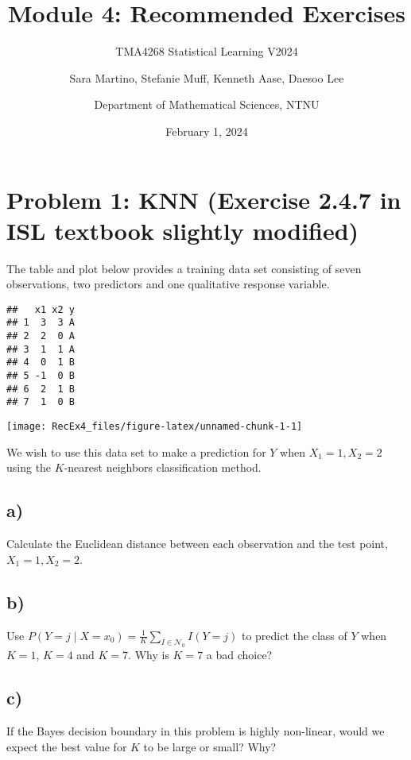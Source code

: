 \documentclass[
]{article}
\title{Module 4: Recommended Exercises}
\subtitle{TMA4268 Statistical Learning V2024}
\author{Sara Martino, Stefanie Muff, Kenneth Aase, Daesoo
Lee \and Department of Mathematical Sciences, NTNU}
\date{February 1, 2024}
\begin{document}
\maketitle

\hypertarget{problem-1-knn-exercise-2.4.7-in-isl-textbook-slightly-modified}{%
\section{Problem 1: KNN (Exercise 2.4.7 in ISL textbook slightly
modified)}\label{problem-1-knn-exercise-2.4.7-in-isl-textbook-slightly-modified}}

The table and plot below provides a training data set consisting of
seven observations, two predictors and one qualitative response
variable.

\begin{verbatim}
##   x1 x2 y
## 1  3  3 A
## 2  2  0 A
## 3  1  1 A
## 4  0  1 B
## 5 -1  0 B
## 6  2  1 B
## 7  1  0 B
\end{verbatim}

\begin{center}\texttt{[image: RecEx4\_files/figure-latex/unnamed-chunk-1-1]} \end{center}

We wish to use this data set to make a prediction for \(Y\) when
\(X_1=1, X_2=2\) using the \(K\)-nearest neighbors classification
method.

\hypertarget{a}{%
\subsection{a)}\label{a}}

Calculate the Euclidean distance between each observation and the test
point, \(X_1=1,X_2=2\).

\hypertarget{b}{%
\subsection{b)}\label{b}}

Use \(P(Y=j\mid X=x_0) = \frac{1}{K}\sum_{I \in \mathcal{N}_0}I(Y=j)\)
to predict the class of \(Y\) when \(K=1\), \(K=4\) and \(K=7\). Why is
\(K=7\) a bad choice?

\hypertarget{c}{%
\subsection{c)}\label{c}}

If the Bayes decision boundary in this problem is highly non-linear,
would we expect the best value for \(K\) to be large or small? Why?
\end{document}
